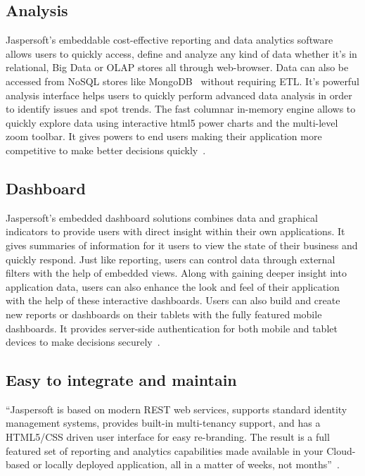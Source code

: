 \subsection{Analysis}
Jaspersoft's embeddable cost-effective reporting and data analytics software
allows users to quickly access, define and analyze any kind of data whether it's
in relational, Big Data or OLAP stores all through web-browser. Data can also be
accessed from NoSQL stores like MongoDB~\cite{hid-sp18-516-www-wiki-mongodb}
without requiring ETL. It's powerful analysis interface helps users to quickly
perform advanced data analysis in order to identify issues and spot trends. The
fast columnar in-memory engine allows to quickly explore data using interactive
html5 power charts and the multi-level zoom toolbar. It gives powers to end
users making their application more competitive to make better decisions
quickly~\cite{hid-sp18-516-www-jaspersoft-analytics-software}.

\subsection{Dashboard}
Jaspersoft's embedded dashboard solutions combines data and graphical indicators
to provide users with direct insight within their own applications. It gives
summaries of information for it users to view the state of their business and
quickly respond. Just like reporting, users can control data through external
filters with the help of embedded views. Along with gaining deeper insight into
application data, users can also enhance the look and feel of their application
with the help of these interactive dashboards. Users can also build and create
new reports or dashboards on their tablets with the fully featured mobile
dashboards. It provides server-side authentication for both mobile and tablet
devices to make decisions
securely~\cite{hid-sp18-516-www-jaspersoft-dashboards}. 

\subsection{Easy to integrate and maintain}
``Jaspersoft is based on modern REST web services, supports standard identity
management systems, provides built-in multi-tenancy support, and has a HTML5/CSS
driven user interface for easy re-branding. The result is a full featured set of
reporting and analytics capabilities made available in your Cloud-based or
locally deployed application, all in a matter of weeks, not 
months''~\cite{hid-sp18-516-www-embedded-bi}.


